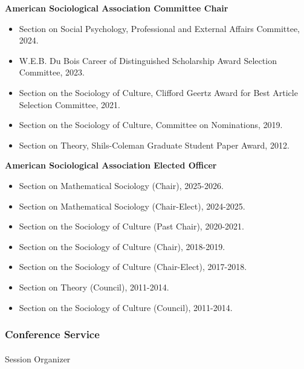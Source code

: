 \documentclass[
]{article}
\makeatletter
\let\oldparagraph\paragraph
\renewcommand{\paragraph}{
    \@ifstar
      \xxxParagraphStar
      \xxxParagraphNoStar
  }
\newcommand{\xxxParagraphStar}[1]{\oldparagraph*{#1}\mbox{}}
\newcommand{\xxxParagraphNoStar}[1]{\oldparagraph{#1}\mbox{}}
\providecommand{\tightlist}{%
  \setlength{\itemsep}{0pt}\setlength{\parskip}{0pt}}
\makeatother
\begin{document}
\textbf{American Sociological Association Committee Chair}

\begin{itemize}
\tightlist
\item
  Section on Social Psychology, Professional and External Affairs
  Committee, 2024.
\item
  W.E.B. Du Bois Career of Distinguished Scholarship Award Selection
  Committee, 2023.
\item
  Section on the Sociology of Culture, Clifford Geertz Award for Best
  Article Selection Committee, 2021.
\item
  Section on the Sociology of Culture, Committee on Nominations, 2019.
\item
  Section on Theory, Shils-Coleman Graduate Student Paper Award, 2012.
\end{itemize}

\textbf{American Sociological Association Elected Officer}

\begin{itemize}
\tightlist
\item
  Section on Mathematical Sociology (Chair), 2025-2026.
\item
  Section on Mathematical Sociology (Chair-Elect), 2024-2025.
\item
  Section on the Sociology of Culture (Past Chair), 2020-2021.
\item
  Section on the Sociology of Culture (Chair), 2018-2019.
\item
  Section on the Sociology of Culture (Chair-Elect), 2017-2018.
\item
  Section on Theory (Council), 2011-2014.
\item
  Section on the Sociology of Culture (Council), 2011-2014.
\end{itemize}

\subsubsection{Conference Service}\label{conference-service}

\paragraph{Session Organizer}\label{session-organizer}
\end{document}
